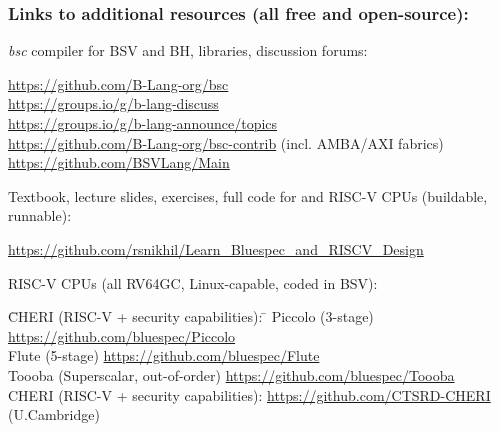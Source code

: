 \begin{frame}[fragile]
\frametitle{Links to additional resources (all free and open-source):}

\emph{bsc} compiler for BSV and BH, libraries, discussion forums:
{\scriptsize
\begin{tabbing}
\hmmm \= \href{https://github.com/B-Lang-org/bsc}{https://github.com/B-Lang-org/bsc} \\
      \> \href{https://groups.io/g/b-lang-discuss}{https://groups.io/g/b-lang-discuss} \\
      \> \href{https://groups.io/g/b-lang-announce/topics}{https://groups.io/g/b-lang-announce/topics} \\
      \> \href{https://github.com/B-Lang-org/bsc-contrib}
              {https://github.com/B-Lang-org/bsc-contrib} \hmm (incl. AMBA/AXI fabrics) \\
      \> \href{https://github.com/BSVLang/Main}
              {https://github.com/BSVLang/Main}
\end{tabbing}}

Textbook, lecture slides, exercises, full code for {\DRUM} and {\FIFE}
RISC-V CPUs (buildable, runnable):

{\scriptsize
\begin{tabbing}
\hmmm \href{https://github.com/rsnikhil/Learn_Bluespec_and_RISCV_Design}
           {https://github.com/rsnikhil/Learn\_Bluespec\_and\_RISCV\_Design}
\end{tabbing}}

RISC-V CPUs (all RV64GC, Linux-capable, coded in BSV):
{\scriptsize
\begin{tabbing}
\hmmm \= CHERI (RISC-V + security capabilities): \hm \= \kill
      \> Piccolo (3-stage)                   \> \href{https://github.com/bluespec/Piccolo}
                                                     {https://github.com/bluespec/Piccolo} \\
      \> Flute (5-stage)                     \> \href{https://github.com/bluespec/Flute}
                                                     {https://github.com/bluespec/Flute} \\
      \> Toooba (Superscalar, out-of-order)  \> \href{https://github.com/bluespec/Toooba}
                                                     {https://github.com/bluespec/Toooba} \\
      \> CHERI (RISC-V + security capabilities): \> \href{https://github.com/CTSRD-CHERI}
                                                     {https://github.com/CTSRD-CHERI}
                                                \hmm (U.Cambridge)
\end{tabbing}}


\end{frame}
